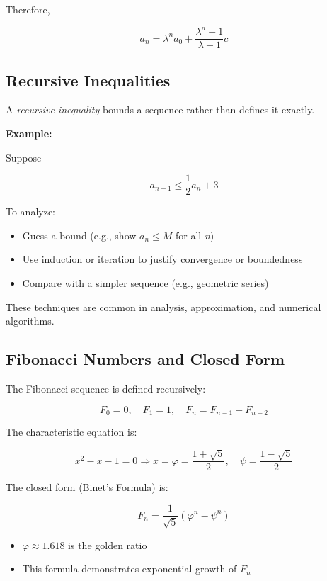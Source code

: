 Therefore,

\[
    a_n = \lambda^n a_0 + \frac{\lambda^n - 1}{\lambda - 1}c
\]

\subsection{Recursive Inequalities}

A \emph{recursive inequality} bounds a sequence rather than defines it exactly.
\vspace{\baselineskip}

\textbf{Example:}
\vspace{\baselineskip}

Suppose

\[
    a_{n+1} \le \frac{1}{2} a_n + 3
\]

To analyze:

\begin{itemize}

    \item Guess a bound (e.g., show \( a_n \le M \) for all \emph{n})

    \item Use induction or iteration to justify convergence or boundedness

    \item Compare with a simpler sequence (e.g., geometric series)

\end{itemize}

These techniques are common in analysis, approximation, and numerical algorithms.

\subsection{Fibonacci Numbers and Closed Form}

The Fibonacci sequence is defined recursively:

\[
    F_0 = 0, \quad F_1 = 1, \quad F_n = F_{n-1} + F_{n-2}
\]

The characteristic equation is:

\[
    x^2 - x - 1 = 0 \Rightarrow x = \varphi = \frac{1 + \sqrt{5}}{2}, \quad \psi = \frac{1 - \sqrt{5}}{2}
\]

The closed form (Binet’s Formula) is:

\[
    F_n = \frac{1}{\sqrt{5}} \left( \varphi^n - \psi^n \right)
\]

\begin{itemize}
    
    \item \( \varphi \approx 1.618 \) is the golden ratio
    
    \item This formula demonstrates exponential growth of \( F_n \)

\end{itemize}

